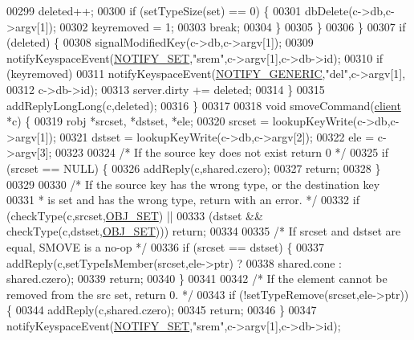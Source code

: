 \begin{DoxyCode}
00299             deleted++;
00300             \textcolor{keywordflow}{if} (setTypeSize(set) == 0) \{
00301                 dbDelete(c->db,c->argv[1]);
00302                 keyremoved = 1;
00303                 \textcolor{keywordflow}{break};
00304             \}
00305         \}
00306     \}
00307     \textcolor{keywordflow}{if} (deleted) \{
00308         signalModifiedKey(c->db,c->argv[1]);
00309         notifyKeyspaceEvent(\hyperlink{server_8h_a625aec945b2152a46979b1b21f2af274}{NOTIFY\_SET},\textcolor{stringliteral}{"srem"},c->argv[1],c->db->id);
00310         \textcolor{keywordflow}{if} (keyremoved)
00311             notifyKeyspaceEvent(\hyperlink{server_8h_a9fa53dd1068e62365f3964ad3479eec2}{NOTIFY\_GENERIC},\textcolor{stringliteral}{"del"},c->argv[1],
00312                                 c->db->id);
00313         server.dirty += deleted;
00314     \}
00315     addReplyLongLong(c,deleted);
00316 \}
00317 
00318 \textcolor{keywordtype}{void} smoveCommand(\hyperlink{structclient}{client} *c) \{
00319     robj *srcset, *dstset, *ele;
00320     srcset = lookupKeyWrite(c->db,c->argv[1]);
00321     dstset = lookupKeyWrite(c->db,c->argv[2]);
00322     ele = c->argv[3];
00323 
00324     \textcolor{comment}{/* If the source key does not exist return 0 */}
00325     \textcolor{keywordflow}{if} (srcset == NULL) \{
00326         addReply(c,shared.czero);
00327         \textcolor{keywordflow}{return};
00328     \}
00329 
00330     \textcolor{comment}{/* If the source key has the wrong type, or the destination key}
00331 \textcolor{comment}{     * is set and has the wrong type, return with an error. */}
00332     \textcolor{keywordflow}{if} (checkType(c,srcset,\hyperlink{server_8h_a8d179375a4aac33d3fa7aa80c8ccc75f}{OBJ\_SET}) ||
00333         (dstset && checkType(c,dstset,\hyperlink{server_8h_a8d179375a4aac33d3fa7aa80c8ccc75f}{OBJ\_SET}))) \textcolor{keywordflow}{return};
00334 
00335     \textcolor{comment}{/* If srcset and dstset are equal, SMOVE is a no-op */}
00336     \textcolor{keywordflow}{if} (srcset == dstset) \{
00337         addReply(c,setTypeIsMember(srcset,ele->ptr) ?
00338             shared.cone : shared.czero);
00339         \textcolor{keywordflow}{return};
00340     \}
00341 
00342     \textcolor{comment}{/* If the element cannot be removed from the src set, return 0. */}
00343     \textcolor{keywordflow}{if} (!setTypeRemove(srcset,ele->ptr)) \{
00344         addReply(c,shared.czero);
00345         \textcolor{keywordflow}{return};
00346     \}
00347     notifyKeyspaceEvent(\hyperlink{server_8h_a625aec945b2152a46979b1b21f2af274}{NOTIFY\_SET},\textcolor{stringliteral}{"srem"},c->argv[1],c->db->id);

\end{DoxyCode}
